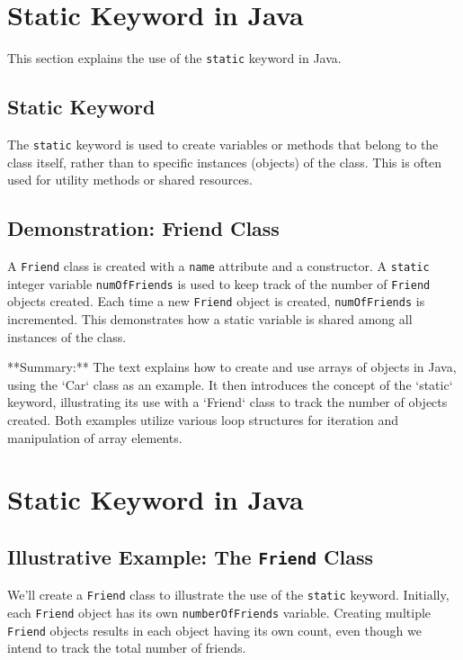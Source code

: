 \documentclass{article}
\begin{document}
\section{Static Keyword in Java}

This section explains the use of the \texttt{static} keyword in Java.

\subsection{Static Keyword}

The \texttt{static} keyword is used to create variables or methods that belong to the class itself, rather than to specific instances (objects) of the class.  This is often used for utility methods or shared resources.


\subsection{Demonstration: Friend Class}

A \texttt{Friend} class is created with a \texttt{name} attribute and a constructor.  A \texttt{static} integer variable \texttt{numOfFriends} is used to keep track of the number of \texttt{Friend} objects created.  Each time a new \texttt{Friend} object is created, \texttt{numOfFriends} is incremented.  This demonstrates how a static variable is shared among all instances of the class.


**Summary:** The text explains how to create and use arrays of objects in Java, using the `Car` class as an example.  It then introduces the concept of the `static` keyword, illustrating its use with a `Friend` class to track the number of objects created.  Both examples utilize various loop structures for iteration and manipulation of array elements.


\section{Static Keyword in Java}

\subsection{Illustrative Example: The \texttt{Friend} Class}

We'll create a \texttt{Friend} class to illustrate the use of the \texttt{static} keyword. Initially, each \texttt{Friend} object has its own \texttt{numberOfFriends} variable.  Creating multiple \texttt{Friend} objects results in each object having its own count, even though we intend to track the total number of friends.
\end{document}
